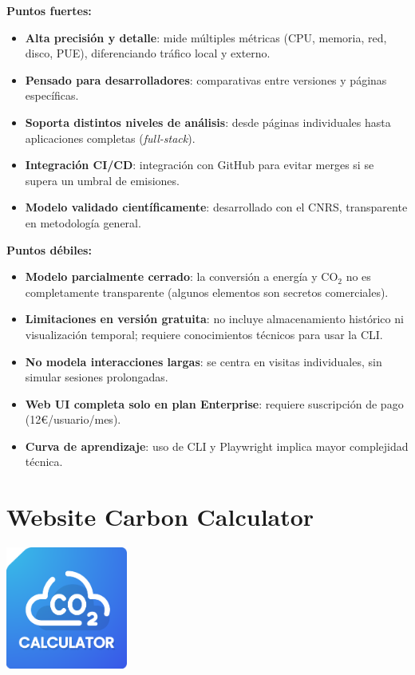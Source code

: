 \documentclass[12pt,a4paper]{report}
\begin{document}
\textbf{Puntos fuertes:}
\begin{itemize}
  \item \textbf{Alta precisión y detalle}: mide múltiples métricas (CPU, memoria, red, disco, PUE), diferenciando tráfico local y externo.
  \item \textbf{Pensado para desarrolladores}: comparativas entre versiones y páginas específicas.
  \item \textbf{Soporta distintos niveles de análisis}: desde páginas individuales hasta aplicaciones completas (\textit{full-stack}).
  \item \textbf{Integración CI/CD}: integración con GitHub para evitar merges si se supera un umbral de emisiones.
  \item \textbf{Modelo validado científicamente}: desarrollado con el CNRS, transparente en metodología general.
\end{itemize}

\textbf{Puntos débiles:}
\begin{itemize}
  \item \textbf{Modelo parcialmente cerrado}: la conversión a energía y CO$_2$ no es completamente transparente (algunos elementos son secretos comerciales).
  \item \textbf{Limitaciones en versión gratuita}: no incluye almacenamiento histórico ni visualización temporal; requiere conocimientos técnicos para usar la CLI.
  \item \textbf{No modela interacciones largas}: se centra en visitas individuales, sin simular sesiones prolongadas.
  \item \textbf{Web UI completa solo en plan Enterprise}: requiere suscripción de pago
        (12€/usuario/mes).
  \item \textbf{Curva de aprendizaje}: uso de CLI y Playwright implica mayor complejidad técnica.
\end{itemize}

\section*{\textbf{Website Carbon Calculator}}

\begin{center}
\includegraphics[width=0.3\textwidth]{imagenes/Website_Logo.png}
\end{center}
\end{document}
